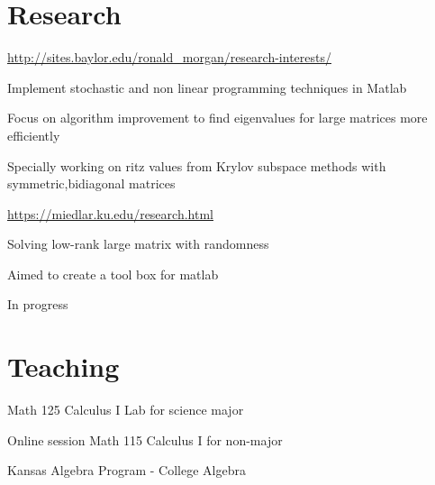 \documentclass[]{deedy-resume-openfont}
\begin{document}
\begin{minipage}[t]{0.66\textwidth} 
\section{Research}

\url{http://sites.baylor.edu/ronald_morgan/research-interests/} 
\vspace{\baselineskip} 
\begin{tightemize}
\item Implement stochastic and non linear programming techniques in Matlab
\item Focus on algorithm improvement to find eigenvalues for large matrices more efficiently
\item Specially working on ritz values from Krylov subspace methods with symmetric,bidiagonal matrices
\end{tightemize}
 \vspace{\baselineskip} 
\url{https://miedlar.ku.edu/research.html} 
\vspace{\baselineskip} 
\begin{tightemize}
\item Solving low-rank large matrix with randomness
\item Aimed to create a tool box for matlab
\item In progress
\end{tightemize}

\sectionsep
\section{Teaching}

Math 125 Calculus I Lab for science major

Online session Math 115 Calculus I for non-major

Kansas Algebra Program - College Algebra
\sectionsep

\end{minipage}
\end{document}
